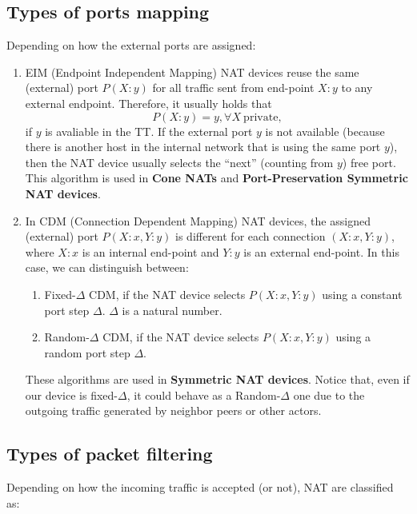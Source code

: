 \subsection{Types of ports mapping}

Depending on how the external ports are assigned:

\begin{enumerate}
\item EIM (Endpoint Independent Mapping) NAT devices reuse the same
  (external) port $P(X:y)$ for all traffic sent from
  end-point $X:y$ to any external endpoint. Therefore, it usually
  holds that
  \begin{equation}
    P(X:y)=y, \forall X~\mathrm{private},
  \end{equation}
  if $y$ is avaliable in the TT. If the external port $y$ is not
  available (because there is another host in the internal network
  that is using the same port $y$), then the NAT device usually
  selects the ``next'' (counting from $y$) free port.  This algorithm
  is used in \textbf{Cone NATs} and \textbf{Port-Preservation
    Symmetric NAT devices}.
\item In CDM (Connection Dependent Mapping) NAT devices, the assigned
  (external) port $P(X:x,Y:y)$ is different for each connection
  $(X:x,Y:y)$, where $X:x$ is an internal end-point and $Y:y$ is an
  external end-point. In this case, we can distinguish between:
  \begin{enumerate}
  \item Fixed-$\Delta$ CDM, if the NAT device selects $P(X:x,Y:y)$
    using a constant port step $\Delta$. $\Delta$ is a natural number.
    \item Random-$\Delta$ CDM, if the NAT device selects $P(X:x,Y:y)$
      using a random port step $\Delta$.
  \end{enumerate}
  These algorithms are used in \textbf{Symmetric NAT devices}. Notice
  that, even if our device is fixed-$\Delta$, it could behave as a
  Random-$\Delta$ one due to the outgoing traffic generated by
  neighbor peers or other actors.
\end{enumerate}

\subsection{Types of packet filtering}

Depending on how the incoming traffic is accepted (or not), NAT are
classified as:


